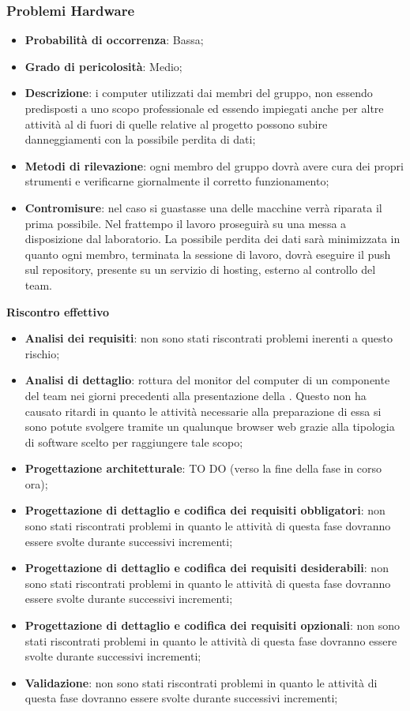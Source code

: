 
		\subsubsection{Problemi Hardware} %
		\label{ssub:problemi_hardware}
			\begin{itemize}
				\item \textbf{Probabilità di occorrenza}: Bassa;
				\item \textbf{Grado di pericolosità}: Medio;
				\item \textbf{Descrizione}: i computer utilizzati dai membri del gruppo, non essendo predisposti a uno scopo professionale ed essendo impiegati anche per altre attività al di fuori di quelle relative al progetto possono subire danneggiamenti con la possibile perdita di dati;
				\item \textbf{Metodi di rilevazione}: ogni membro del gruppo dovrà avere cura dei propri strumenti e verificarne giornalmente il corretto funzionamento;
				\item \textbf{Contromisure}: nel caso si guastasse una delle macchine verrà riparata il prima possibile. Nel frattempo il lavoro proseguirà su una messa a disposizione dal laboratorio. La possibile perdita dei dati sarà minimizzata in quanto ogni membro, terminata la sessione di lavoro, dovrà eseguire il push sul repository, presente su un servizio di hosting, esterno al controllo del team.
			\end{itemize}
		\noindent
		\textbf{Riscontro effettivo}
			\begin{itemize}
				\item \textbf{Analisi dei requisiti}: non sono stati riscontrati problemi inerenti a questo rischio;
				\item \textbf{Analisi di dettaglio}: rottura del monitor del computer di un componente del team nei giorni precedenti alla presentazione della \RR. Questo non ha causato ritardi in quanto le attività necessarie alla preparazione di essa si sono potute svolgere tramite un qualunque browser web grazie alla tipologia di software scelto per raggiungere tale scopo;
				\item \textbf{Progettazione architetturale}: TO DO (verso la fine della fase in corso ora);
				\item \textbf{Progettazione di dettaglio e codifica dei requisiti obbligatori}: non sono stati riscontrati problemi in quanto le attività di questa fase dovranno essere svolte durante successivi incrementi;
				\item \textbf{Progettazione di dettaglio e codifica dei requisiti desiderabili}: non sono stati riscontrati problemi in quanto le attività di questa fase dovranno essere svolte durante successivi incrementi;
				\item \textbf{Progettazione di dettaglio e codifica dei requisiti opzionali}: non sono stati riscontrati problemi in quanto le attività di questa fase dovranno essere svolte durante successivi incrementi;
				\item \textbf{Validazione}: non sono stati riscontrati problemi in quanto le attività di questa fase dovranno essere svolte durante successivi incrementi;
			\end{itemize}
